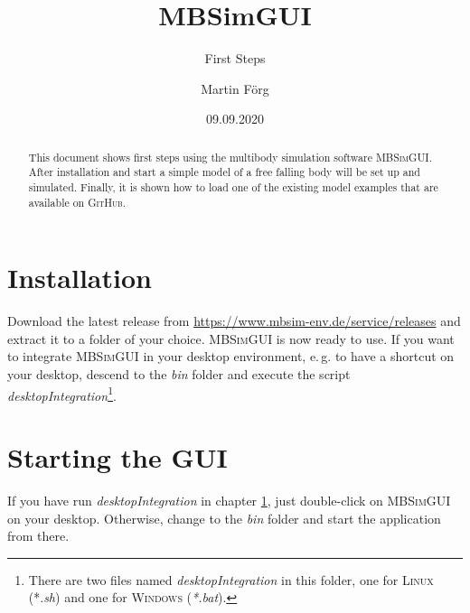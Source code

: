 \documentclass[
a4paper,
fleqn,
DIV=15,
pagesize
]{scrartcl}
\begin{document}
\subject{MBSim -- Environment}
\title{MBSimGUI}
\subtitle{First Steps}
\author{Martin Förg}
\date{09.09.2020}

\maketitle

\begin{abstract}
This document shows first steps using the multibody simulation software
\textsc{MBSimGUI}. After installation and start a
simple model of a free falling body will be set up and simulated. Finally, it is shown how to load one of the existing model examples that are available on \textsc{GitHub}.
\end{abstract}


\tableofcontents


\section{Installation} \label{installation}
Download the latest release from
\url{https://www.mbsim-env.de/service/releases} and extract it to a folder of
your choice. \textsc{MBSimGUI} is now ready to use. If you want to integrate
\textsc{MBSimGUI} in your desktop environment, e.\,g. to have a shortcut on
your desktop, descend to the \emph{bin} folder and execute the script
\emph{desktopIntegration}\footnote{There are two files named
\emph{desktopIntegration} in this folder, one for \textsc{Linux}
(*.\emph{sh}) and one for \textsc{Windows} (\emph{*.bat}).}.

\section{Starting the GUI}

If you have run \emph{desktopIntegration} in chapter \ref{installation}, just double-click on \textsc{MBSimGUI} on your desktop. Otherwise, change to the \emph{bin} folder and start the application from there.
\end{document}
